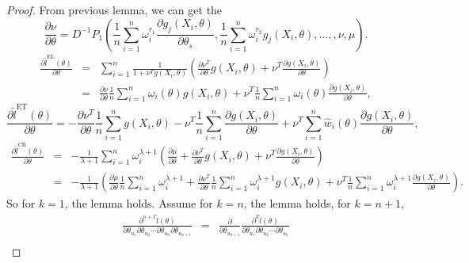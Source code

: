 \begin{proof}
From previous lemma, we can get the 
\[
\frac{\partial\nu}{\partial\theta}=D^{-1}P_{1}\left(\frac{1}{n}\sum_{i=1}^{n}\omega_{i}^{r_{1}}\frac{\partial g_{j}\left(X_{i},\theta\right)}{\partial\theta_{s}},\frac{1}{n}\sum_{i=1}^{n}\omega_{i}^{r_{2}}g_{j}\left(X_{i},\theta\right),\ldots,,\nu,\mu\right).
\]
\begin{eqnarray*}
\frac{\partial\tilde{l}^{\mathrm{EL}}\left(\theta\right)}{\partial\theta} & = & \sum_{i=1}^{n}\frac{1}{1+\nu^{T}g\left(X_{i},\theta\right)}\left(\frac{\partial\nu^{T}}{\partial\theta}g\left(X_{i},\theta\right)+\nu^{T}\frac{\partial g\left(X_{i},\theta\right)}{\partial\theta}\right)\\
 & = & \frac{\partial\nu}{\partial\theta}\frac{1}{n}\sum_{i=1}^{n}\omega_{i}\left(\theta\right)g\left(X_{i},\theta\right)+\nu^{T}\frac{1}{n}\sum_{i=1}^{n}\omega_{i}\left(\theta\right)\frac{\partial g\left(X_{i},\theta\right)}{\partial\theta},
\end{eqnarray*}
\[
\frac{\partial\tilde{l}^{\mathrm{ET}}\left(\theta\right)}{\partial\theta}=-\frac{\partial\nu^{T}}{\partial\theta}\frac{1}{n}\sum_{i=1}^{n}g\left(X_{i},\theta\right)-\nu^{T}\frac{1}{n}\sum_{i=1}^{n}\frac{\partial g\left(X_{i},\theta\right)}{\partial\theta}+\nu^{T}\sum_{i=1}^{n}\hat{w}_{i}\left(\theta\right)\frac{\partial g\left(X_{i},\theta\right)}{\partial\theta},
\]
\begin{eqnarray*}
\frac{\partial\tilde{l}^{\mathrm{CR}}\left(\theta\right)}{\partial\theta} & = & -\frac{1}{\lambda+1}\sum_{i=1}^{n}\omega_{i}^{\lambda+1}\left(\frac{\partial\mu}{\partial\theta}+\frac{\partial\nu^{T}}{\partial\theta}g\left(X_{i},\theta\right)+\nu^{T}\frac{\partial g\left(X_{i},\theta\right)}{\partial\theta}\right)\\
 & = & -\frac{1}{\lambda+1}\left(\frac{\partial\mu}{\partial\theta}\frac{1}{n}\sum_{i=1}^{n}\omega_{i}^{\lambda+1}+\frac{\partial\nu^{T}}{\partial\theta}\frac{1}{n}\sum_{i=1}^{n}\omega_{i}^{\lambda+1}g\left(X_{i},\theta\right)+\nu^{T}\frac{1}{n}\sum_{i=1}^{n}\omega_{i}^{\lambda+1}\frac{\partial g\left(X_{i},\theta\right)}{\partial\theta}\right).
\end{eqnarray*}
So for $k=1$, the lemma holds. Assume for $k=n$, the lemma holds,
for $k=n+1$, 
\begin{eqnarray*}
\frac{\partial^{n+1}\tilde{l}\left(\theta\right)}{\partial\theta_{u_{1}}\partial\theta_{u_{2}}\cdots\partial\theta_{u_{n}}\partial\theta_{u_{n+1}}} & = &  \frac{\partial}{\partial\theta_{u_{n+1}}}\frac{\partial^{k}\tilde{l}\left(\theta\right)}{\partial\theta_{u_{1}}\partial\theta_{u_{2}}\cdots\partial\theta_{u_{k}}}\\

\end{eqnarray*}
\end{proof}
